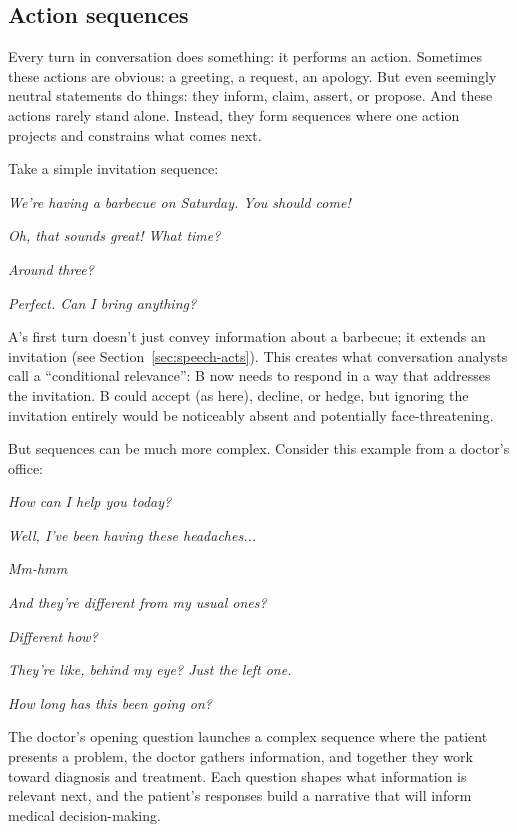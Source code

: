 \subsection{Action sequences} \label{subsec:action-seq}

Every turn in conversation does something: it performs an action. Sometimes these actions are obvious: a greeting, a request, an apology. But even seemingly neutral statements do things: they inform, claim, assert, or propose. And these actions rarely stand alone. Instead, they form sequences where one action projects and constrains what comes next.

Take a simple invitation sequence:

\ea
\begin{dialogue}
\item[A] \emph{We're having a barbecue on Saturday. You should come!}
\item[B] \emph{Oh, that sounds great! What time?}
\item[A] \emph{Around three?}
\item[B] \emph{Perfect. Can I bring anything?}
\end{dialogue}
\z
A's first turn doesn't just convey information about a barbecue; it extends an invitation (see Section~\ref{sec:speech-acts}). This creates what conversation analysts call a \enquote{conditional relevance}: B now needs to respond in a way that addresses the invitation. B could accept (as here), decline, or hedge, but ignoring the invitation entirely would be noticeably absent and potentially face-threatening.

But sequences can be much more complex. Consider this example from a doctor's office:

\ea
\begin{dialogue}
\item[Doctor] \emph{How can I help you today?}
\item[Patient] \emph{Well, I've been having these headaches...}
\item[Doctor] \emph{Mm-hmm}
\item[Patient] \emph{And they're different from my usual ones?}
\item[Doctor] \emph{Different how?}
\item[Patient] \emph{They're like, behind my eye? Just the left one.}
\item[Doctor] \emph{How long has this been going on?}
\end{dialogue}
\z
The doctor's opening question launches a complex sequence where the patient presents a problem, the doctor gathers information, and together they work toward diagnosis and treatment. Each question shapes what information is relevant next, and the patient's responses build a narrative that will inform medical decision-making.


